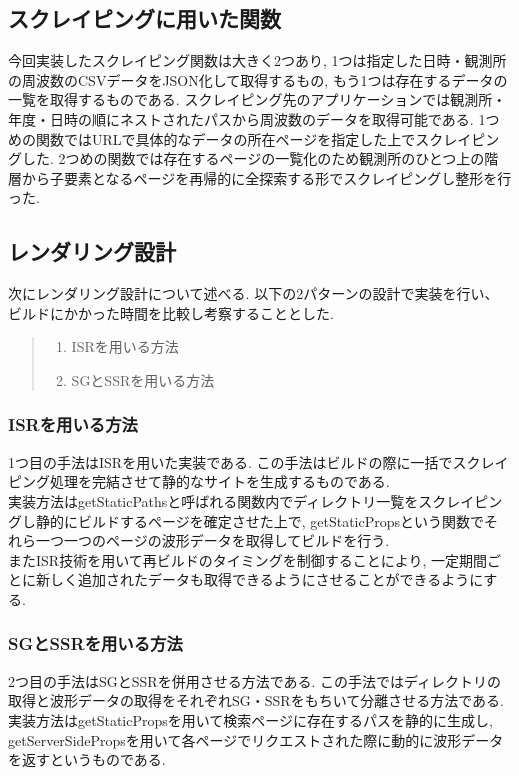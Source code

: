 \subsection{スクレイピングに用いた関数}
今回実装したスクレイピング関数は大きく2つあり, 1つは指定した日時・観測所の周波数のCSVデータをJSON化して取得するもの, もう1つは存在するデータの一覧を取得するものである.
スクレイピング先のアプリケーションでは観測所・年度・日時の順にネストされたパスから周波数のデータを取得可能である. 
1つめの関数ではURLで具体的なデータの所在ページを指定した上でスクレイピングした.
2つめの関数では存在するページの一覧化のため観測所のひとつ上の階層から子要素となるページを再帰的に全探索する形でスクレイピングし整形を行った.

\subsection{レンダリング設計}
次にレンダリング設計について述べる.
以下の2パターンの設計で実装を行い、ビルドにかかった時間を比較し考察することとした.
\begin{quote}
	\begin{enumerate}
		\item ISRを用いる方法
		\item SGとSSRを用いる方法
	\end{enumerate}
\end{quote}
\subsubsection{ISRを用いる方法}
1つ目の手法はISRを用いた実装である.
この手法はビルドの際に一括でスクレイピング処理を完結させて静的なサイトを生成するものである.\\
実装方法はgetStaticPathsと呼ばれる関数内でディレクトリ一覧をスクレイピングし静的にビルドするページを確定させた上で, getStaticPropsという関数でそれら一つ一つのページの波形データを取得してビルドを行う.\\
またISR技術を用いて再ビルドのタイミングを制御することにより, 一定期間ごとに新しく追加されたデータも取得できるようにさせることができるようにする.

\subsubsection{SGとSSRを用いる方法}
2つ目の手法はSGとSSRを併用させる方法である.
この手法ではディレクトリの取得と波形データの取得をそれぞれSG・SSRをもちいて分離させる方法である.
実装方法はgetStaticPropsを用いて検索ページに存在するパスを静的に生成し, getServerSidePropsを用いて各ページでリクエストされた際に動的に波形データを返すというものである.

